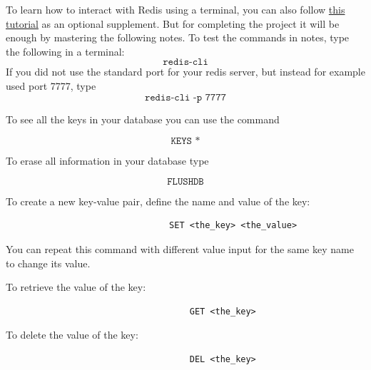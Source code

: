 \documentclass{article}
\begin{document}
To learn how to interact with Redis using a terminal, you can also follow {\color{blue}\href{https://auth0.com/blog/introduction-to-redis-install-cli-commands-and-data-types/}{this tutorial}} as an optional supplement. But for completing the project it will be enough by mastering the following notes. To test the commands in notes, type the following in a terminal:
\begin{equation}
    \texttt{redis-cli}
\end{equation}
If you did not use the standard port for your redis server, but instead for example used port 7777, type
\begin{equation}
    \texttt{redis-cli -p 7777}
\end{equation}

\parbox[t]{14cm}{To see all the keys in your database you can use the command 
}
\begin{equation}
    \texttt{KEYS *}
\end{equation}
\parbox[t]{14cm}{To erase all information in your database type 
}
\begin{equation}
    \texttt{FLUSHDB}
\end{equation}

\parbox[t]{14cm}{To create a new key-value pair, define the name and value of the key:
}
                            \begin{verbatim}
                                SET <the_key> <the_value>
                            \end{verbatim}
 
You can repeat this command with different value input for the same key name to change its value.


\parbox[t]{14cm}{To retrieve the value of the key:
}
                                \begin{verbatim}
                                    GET <the_key> 
                                \end{verbatim}

\parbox[t]{14cm}{To delete the value of the key:
}
                                \begin{verbatim}
                                    DEL <the_key> 
                                \end{verbatim}
\end{document}
